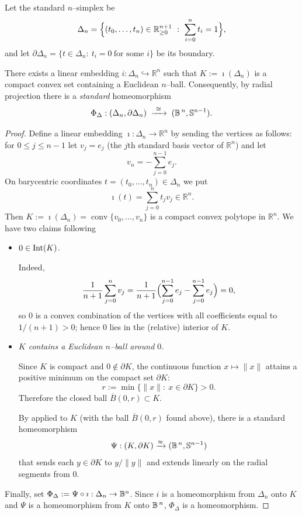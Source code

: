 \begin{corollary}\label{cor:simplex-ball}
    Let the standard $n$–simplex be
    \[
        \Delta_n=\Bigl\{(t_0,\dots,t_n)\in\mathbb{R}^{n+1}_{\ge 0}\ :\ \sum_{i=0}^n t_i=1\Bigr\},
    \]
    and let $\partial \Delta_n=\{t\in\Delta_n:\ t_i=0\ \text{for some }i\}$ be its boundary.
    
    There exists a linear embedding $i:\Delta_n\hookrightarrow\mathbb{R}^n$ such that $K:=\imath (\Delta_n)$ is a compact convex set containing a Euclidean $n$–ball. Consequently, by radial projection there is a \emph{standard} homeomorphism
    \[
        \Phi_\Delta:(\Delta_n,\partial \Delta_n)\;\xrightarrow{\ \cong\ }\;(\B^{\,n},\mathbb{S}^{n-1}).
    \]
\end{corollary}

\begin{proof}
    Define a linear embedding $\imath:\Delta_n\to\mathbb{R}^n$ by sending the vertices as follows:
for $0\le j\le n-1$ let $v_j=e_j$ (the $j$th standard basis vector of $\mathbb{R}^n$) and let
\[
   v_n=-\sum_{j=0}^{n-1} e_j.
\]
On barycentric coordinates $t=(t_0,\dots,t_n)\in\Delta_n$ we put
\[
   \imath(t)=\sum_{j=0}^n t_j v_j\in\mathbb{R}^n.
\]
Then $K:=\imath(\Delta_n)=\operatorname{conv}\{v_0,\dots,v_n\}$ is a compact convex polytope in $\mathbb{R}^n$. We have two claims following
\begin{itemize}
    \item $0\in\operatorname{Int}(K)$.
    
Indeed,
\[
   \frac{1}{n+1}\sum_{j=0}^n v_j
   =\frac{1}{n+1}\Bigl(\sum_{j=0}^{n-1} e_j - \sum_{j=0}^{n-1} e_j\Bigr)=0,
\]
so $0$ is a convex combination of the vertices with all coefficients equal to $1/(n+1)>0$; hence $0$ lies in the (relative) interior of $K$.

\item \textit{$K$ contains a Euclidean $n$–ball around $0$.}

Since $K$ is compact and $0\notin\partial K$, the continuous function $x\mapsto\|x\|$ attains a positive minimum on the compact set $\partial K$:
\[
   r:=\min\{\|x\|:\ x\in\partial K\}>0.
\]
Therefore the closed ball $\overline B(0,r)\subset K$.

By  applied to $K$ (with the ball $\overline B(0,r)$ found above), there is a standard homeomorphism
\[
   \Psi:(K,\partial K)\xrightarrow{\approx}( \mathbb{B}^{\,n},\mathbb{S}^{n-1})
\]
that sends each $y\in\partial K$ to $y/\|y\|$ and extends linearly on the radial segments from $0$.
\end{itemize}
Finally, set $\Phi_\Delta:=\Psi\circ \imath:\Delta_n \to \mathbb{B}^{n}$. Since $i$ is a homeomorphism from $\Delta_n$ onto $K$ and $\Psi$ is a homeomorphism from $K$ onto $\mathbb{B}^{\,n}$, $\Phi_\Delta$ is a homeomorphism.


\end{proof}
